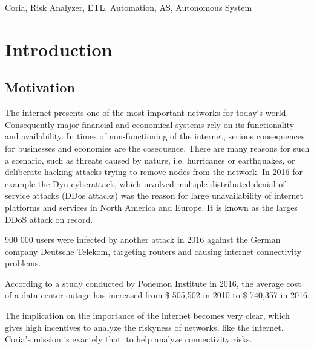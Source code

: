 \documentclass[conference]{IEEEtran}
\begin{document}
\begin{IEEEkeywords}
Coria, Risk Analyzer, ETL, Automation, AS, Autonomous System
\end{IEEEkeywords}


\section{Introduction}
\subsection{Motivation}
The internet presents one of the most important networks for today‘s world. Consequently major financial and economical systems rely on its functionality and availability. In times of non-functioning of the internet, serious consequences for businesses and economies are the cosequence. There are many reasons for such a scenario, such as threats caused by nature, i.e. hurricanes or earthquakes, or deliberate hacking attacks trying to remove nodes from the network.  
In 2016 for example the Dyn cyberattack, which involved multiple distributed denial-of-service attacks (DDos attacks) was the reason for large unavailability of internet platforms and services in North America and Europe. It is known as the larges DDoS attack on record.

900 000 users were infected by another attack in 2016 against the German company Deutsche Telekom, targeting routers and causing internet connectivity problems. 

According to a study conducted by Ponemon Institute in 2016, the average cost of a data center outage has increased from \$ 505,502 in 2010 to \$ 740,357 in 2016.


The implication on the importance of the internet becomes very clear, which gives high incentives to analyze the riskyness of networks, like the internet. Coria's mission is exactely that: to help analyze connectivity risks. 
\end{document}
